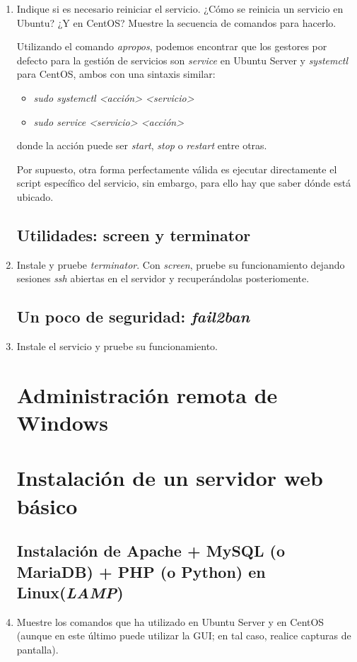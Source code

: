 \documentclass[paper=a4, fontsize=11pt]{scrartcl} %
\numberwithin{equation}{section} %
\numberwithin{figure}{section} %
\numberwithin{table}{section} %
\begin{document}
\begin{enumerate}
		\item Indique si es necesario reiniciar el servicio. ¿Cómo se reinicia un servicio en Ubuntu?
		¿Y en CentOS? Muestre la secuencia de comandos para hacerlo.
		
		Utilizando el comando \textit{apropos}\cite{man_apropos}, podemos encontrar que los gestores
		por defecto para la gestión de servicios son \textit{service}\cite{man_service} en Ubuntu Server
		y \textit{systemctl}\cite{man_systemctl} para CentOS, ambos con una sintaxis similar:
		
		\begin{itemize}
			\item \textit{sudo systemctl <acción> <servicio>}
			\item \textit{sudo service <servicio> <acción>}
		\end{itemize}
		donde la acción puede ser \textit{start}, \textit{stop} o \textit{restart} entre otras.
		
		Por supuesto, otra forma perfectamente válida es ejecutar directamente el script específico del
		servicio, sin embargo, para ello hay que saber dónde está ubicado.
		
	
	\subsection{Utilidades: screen y terminator}
		\item Instale y pruebe \textit{terminator}. Con \textit{screen}, pruebe su funcionamiento
		dejando sesiones \textit{ssh} abiertas en el servidor y recuperándolas posteriomente.
	
	\subsection{Un poco de seguridad: \textit{fail2ban}}
		\item Instale el servicio y pruebe su funcionamiento.
	
	\section{Administración remota de Windows}
	\section{Instalación de un servidor web básico}
	\subsection{Instalación de Apache + MySQL (o MariaDB) + PHP (o Python) en Linux(\textit{LAMP})}
		\item Muestre los comandos que ha utilizado en Ubuntu Server y en CentOS (aunque en este último
		puede utilizar la GUI; en tal caso, realice capturas de pantalla).
		

\end{enumerate}
\end{document}
